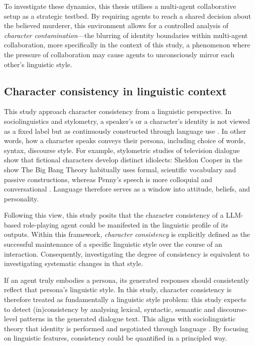 \documentclass{article}
\begin{document}
To investigate these dynamics, this thesis utilises a multi-agent collaborative setup as a strategic testbed. By requiring agents to reach a shared decision about the believed murderer, this environment allows for a controlled analysis of \emph{character contamination}—the blurring of identity boundaries within multi-agent collaboration, more specifically in the context of this study, a phenomenon where the pressure of collaboration may cause agents to unconsciously mirror each other's linguistic style.


\subsection{Character consistency in linguistic context} \label{sec:intro_cc_in_ling}

This study approach character consistency from a linguistic perspective. In sociolinguistics and stylometry, a speaker's or a character's identity is not viewed as a fixed label but as continuously constructed through language use \citep{ przystalski2025stylometry}. In other words, how a character speaks conveys their persona, including choice of words, syntax, discourse style. For example, stylometric studies of television dialogue show that fictional characters develop distinct idiolects: Sheldon Cooper in the show The Big Bang Theory habitually uses formal, scientific vocabulary and passive constructions, whereas Penny's speech is more colloquial and conversational \citep{van2016stylometry}. Language therefore serves as a window into attitude, beliefs, and personality.

Following this view, this study posits that the character consistency of a LLM-based role-playing agent could be manifested in the linguistic profile of its outputs. Within this framework, \emph{character consistency} is explicitly defined as the successful maintenance of a specific linguistic style over the course of an interaction. Consequently, investigating the degree of consistency is equivalent to investigating systematic changes in that style.

If an agent truly embodies a persona, its generated responses should consistently reflect that persona's linguistic style. In this study, character consistency is therefore treated as fundamentally a linguistic style problem: this study expects to detect (in)consistency by analysing lexical, syntactic, semantic and discourse-level patterns in the generated dialogue text. This aligns with sociolinguistic theory that identity is performed and negotiated through language \citep{bucholtz2005identity}. By focusing on linguistic features, consistency could be quantified in a principled way.
\end{document}
